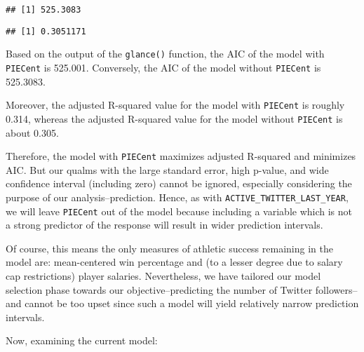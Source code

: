 \documentclass[]{article}
\newenvironment{Shaded}{\begin{snugshade}}{\end{snugshade}}
\newcommand{\DataTypeTok}[1]{\textcolor[rgb]{0.13,0.29,0.53}{#1}}
\newcommand{\DecValTok}[1]{\textcolor[rgb]{0.00,0.00,0.81}{#1}}
\newcommand{\KeywordTok}[1]{\textcolor[rgb]{0.13,0.29,0.53}{\textbf{#1}}}
\newcommand{\NormalTok}[1]{#1}
\newcommand{\OperatorTok}[1]{\textcolor[rgb]{0.81,0.36,0.00}{\textbf{#1}}}
\newcommand{\OtherTok}[1]{\textcolor[rgb]{0.56,0.35,0.01}{#1}}
\newcommand{\StringTok}[1]{\textcolor[rgb]{0.31,0.60,0.02}{#1}}
\begin{document}
\begin{Shaded}
\end{Shaded}

\begin{verbatim}
## [1] 525.3083
\end{verbatim}

\begin{Shaded}
\end{Shaded}

\begin{verbatim}
## [1] 0.3051171
\end{verbatim}

Based on the output of the \texttt{glance()} function, the AIC of the
model with \texttt{PIECent} is 525.001. Conversely, the AIC of the model
without \texttt{PIECent} is 525.3083.

Moreover, the adjusted R-squared value for the model with
\texttt{PIECent} is roughly 0.314, whereas the adjusted R-squared value
for the model without \texttt{PIECent} is about 0.305.

Therefore, the model with \texttt{PIECent} maximizes adjusted R-squared
and minimizes AIC. But our qualms with the large standard error, high
p-value, and wide confidence interval (including zero) cannot be
ignored, especially considering the purpose of our analysis--prediction.
Hence, as with \texttt{ACTIVE\_TWITTER\_LAST\_YEAR}, we will leave
\texttt{PIECent} out of the model because including a variable which is
not a strong predictor of the response will result in wider prediction
intervals.

Of course, this means the only measures of athletic success remaining in
the model are: mean-centered win percentage and (to a lesser degree due
to salary cap restrictions) player salaries. Nevertheless, we have
tailored our model selection phase towards our objective--predicting the
number of Twitter followers--and cannot be too upset since such a model
will yield relatively narrow prediction intervals.

Now, examining the current model:

\begin{Shaded}
\end{Shaded}
\end{document}
